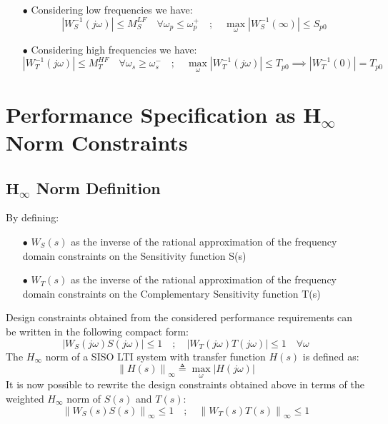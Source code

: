 \documentclass{article}
\numberwithin{equation}{subsection}
\begin{document}
	\begin{enumerate}
		\item[$\bullet$] Considering low frequencies we have:
		\begin{equation}
			\left| W_S^{-1}(j\omega) \right| \leq M_S^{LF} \quad \forall 	\omega_p\leq\omega_p^+ \quad ; \quad \max_\omega \left| W_S^{-1}(\infty) \right| \leq S_{p0}
		\end{equation}	
		\item[$\bullet$] Considering high frequencies we have:
		\begin{equation}
			\left| W_T^{-1}(j\omega) \right| \leq M_T^{HF} \quad \forall 	\omega_s\geq\omega_s^- \quad ; \quad \max_\omega \left| W_T^{-1}(j\omega) \right| \leq T_{p0} \implies \left| W_T^{-1}(0) \right| = T_{p0}
		\end{equation}
	\end{enumerate}
	
	\section{Performance Specification as $\boldsymbol{H_\infty}$ Norm Constraints}
	\subsection{$\boldsymbol{H_\infty}$ Norm Definition}
	By defining:
	\begin{enumerate}
		\item[$\bullet$] $W_S(s)$ as the inverse of the rational approximation of the frequency domain constraints on the Sensitivity function S(s)
		\item[$\bullet$] $W_T(s)$ as the inverse of the rational approximation of the frequency domain constraints on the Complementary Sensitivity function T(s)
	\end{enumerate}
	Design constraints obtained from the considered performance requirements can be written in the following compact form:
	\begin{equation}
		\left| W_S(j\omega)S(j\omega) \right| \leq 1 \quad ; \quad \left| W_T(j\omega)T(j\omega) \right| \leq 1 \quad \forall\omega	
	\end{equation}
	The $H_\infty$ norm of a SISO LTI system with transfer function $H(s)$ is defined as:
	\begin{equation}
		\left\lVert H(s) \right\rVert_\infty \triangleq \max_\omega \left| H(j\omega) \right|
	\end{equation}
	It is now possible to rewrite the design constraints obtained above in terms of the weighted $H_\infty$ norm of $S(s)$ and $T(s)$:
	\begin{equation}
		\left\lVert W_S(s)S(s) \right\rVert_\infty \leq 1 \quad ; \quad \left\lVert W_T(s)T(s) \right\rVert_\infty \leq 1
	\end{equation}
	
	
\end{document}
